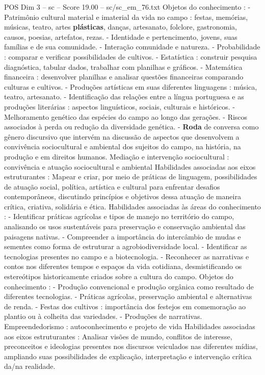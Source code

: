 \begin{textsample}{POS Dim 3 – sc – Score 19.00 – sc/sc\_em\_76.txt}
Objetos do conhecimento : - Patrimônio cultural material e imaterial da vida no campo : festas, memórias, músicas, teatro, artes \textbf{plásticas}, danças, artesanato, folclore, gastronomia, causos, poesias, artefatos, rezas. - Identidade e pertencimento, jovens, suas famílias e de sua comunidade. - Interação comunidade e natureza. - Probabilidade : comparar e verificar possibilidades de cultivos. - Estatística : construir pesquisa diagnóstica, tabular dados, trabalhar com planilhas e gráficos. - Matemática financeira : desenvolver planilhas e analisar questões financeiras comparando culturas e cultivos. - Produções artísticas em suas diferentes linguagens : música, teatro, artesanato. - Identificação das relações entre a língua portuguesa e as produções literárias : aspectos linguísticos, sociais, culturais e históricos. - Melhoramento genético das espécies do campo ao longo das gerações. - Riscos associados à perda ou redução da diversidade genética. - \textbf{Roda} de conversa como gênero discursivo que intervém na discussão de aspectos que desenvolvem a convivência sociocultural e ambiental dos sujeitos do campo, na história, na produção e em direitos humanos.
Mediação e intervenção sociocultural : convivência e atuação sociocultural e ambiental Habilidades associadas aos eixos estruturantes : Mapear e criar, por meio de práticas de linguagem, possibilidades de atuação social, política, artística e cultural para enfrentar desafios contemporâneos, discutindo princípios e objetivos dessa atuação de maneira crítica, criativa, solidária e ética.
Habilidades associadas às áreas do conhecimento : - Identificar práticas agrícolas e tipos de manejo no território do campo, analisando os usos sustentáveis para preservação e conservação ambiental das paisagens nativas. - Compreender a importância do intercâmbio de mudas e sementes como forma de estruturar a agrobiodiversidade local. - Identificar as tecnologias presentes no campo e a biotecnologia. - Reconhecer as narrativas e contos nos diferentes tempos e espaços da vida cotidiana, desmistificando os estereótipos historicamente criados sobre a cultura do campo.
Objetos do conhecimento : - Produção convencional e produção orgânica como resultado de diferentes tecnologias. - Práticas agrícolas, preservação ambiental e alternativas de renda. - Festas dos cultivos : importância dos festejos em comemoração ao plantio ou à colheita das variedades. - Produções de narrativas.
Empreendedorismo : autoconhecimento e projeto de vida Habilidades associadas aos eixos estruturantes : Analisar visões de mundo, conflitos de interesse, preconceitos e ideologias presentes nos discursos veiculados nas diferentes mídias, ampliando suas possibilidades de explicação, interpretação e intervenção crítica da/na realidade.

\end{textsample}
